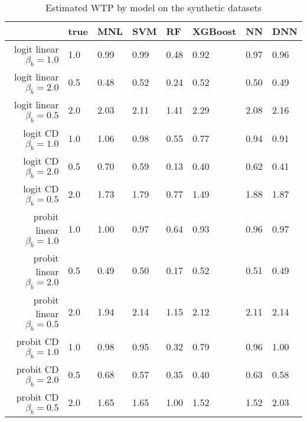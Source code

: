 \begin{table}
\centering
\caption{Estimated WTP by model on the synthetic datasets}
\label{tab:experiment_3_WTP_table}
\begin{tabular}{rlllllll}
\toprule
{} &  true &   MNL &   SVM &    RF &  XGBoost &    NN &   DNN \\
\midrule
logit linear $\beta_b=1.0$  &   1.0 &  0.99 &  0.99 &  0.48 &     0.92 &  0.97 &  0.96 \\
logit linear $\beta_b=2.0$  &   0.5 &  0.48 &  0.52 &  0.24 &     0.52 &  0.50 &  0.49 \\
logit linear $\beta_b=0.5$  &   2.0 &  2.03 &  2.11 &  1.41 &     2.29 &  2.08 &  2.16 \\
logit CD $\beta_b=1.0$      &   1.0 &  1.06 &  0.98 &  0.55 &     0.77 &  0.94 &  0.91 \\
logit CD $\beta_b=2.0$      &   0.5 &  0.70 &  0.59 &  0.13 &     0.40 &  0.62 &  0.41 \\
logit CD $\beta_b=0.5$      &   2.0 &  1.73 &  1.79 &  0.77 &     1.49 &  1.88 &  1.87 \\
probit linear $\beta_b=1.0$ &   1.0 &  1.00 &  0.97 &  0.64 &     0.93 &  0.96 &  0.97 \\
probit linear $\beta_b=2.0$ &   0.5 &  0.49 &  0.50 &  0.17 &     0.52 &  0.51 &  0.49 \\
probit linear $\beta_b=0.5$ &   2.0 &  1.94 &  2.14 &  1.15 &     2.12 &  2.11 &  2.14 \\
probit CD $\beta_b=1.0$     &   1.0 &  0.98 &  0.95 &  0.32 &     0.79 &  0.96 &  1.00 \\
probit CD $\beta_b=2.0$     &   0.5 &  0.68 &  0.57 &  0.35 &     0.40 &  0.63 &  0.58 \\
probit CD $\beta_b=0.5$     &   2.0 &  1.65 &  1.65 &  1.00 &     1.52 &  1.52 &  2.03 \\
\bottomrule
\end{tabular}
\end{table}
